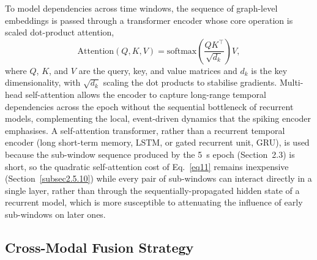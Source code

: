 \documentclass[pdflatex,sn-basic,Numbered]{sn-jnl}
\begin{document}
To model dependencies across time windows, the sequence of graph-level embeddings is passed through a transformer encoder \cite{ref44} whose core operation is scaled dot-product attention,
\begin{equation}
\mathrm{Attention}(Q,K,V) = \mathrm{softmax}\!\left(\frac{QK^\top}{\sqrt{d_k}}\right) V, \label{eq11}
\end{equation}
where $Q$, $K$, and $V$ are the query, key, and value matrices and $d_k$ is the key dimensionality, with $\sqrt{d_k}$ scaling the dot products to stabilise gradients. Multi-head self-attention allows the encoder to capture long-range temporal dependencies across the epoch without the sequential bottleneck of recurrent models, complementing the local, event-driven dynamics that the spiking encoder emphasises. A self-attention transformer, rather than a recurrent temporal encoder (long short-term memory, LSTM, or gated recurrent unit, GRU), is used because the sub-window sequence produced by the 5~s epoch (Section~2.3) is short, so the quadratic self-attention cost of Eq.~\eqref{eq11} remains inexpensive (Section~\ref{subsec2.5.10}) while every pair of sub-windows can interact directly in a single layer, rather than through the sequentially-propagated hidden state of a recurrent model, which is more susceptible to attenuating the influence of early sub-windows on later ones.

\subsection{Cross-Modal Fusion Strategy}\label{subsec2.5.7}
\end{document}
